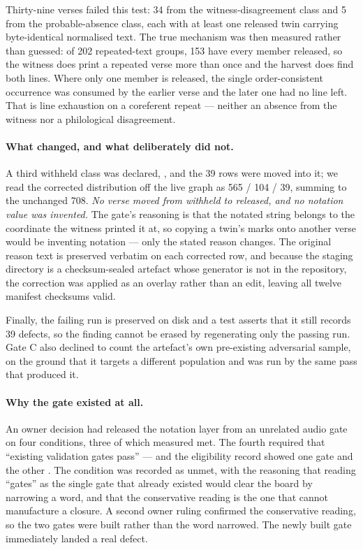 Thirty-nine verses failed this test: 34 from the witness-disagreement class and 5
from the probable-absence class, each with at least one released twin carrying
byte-identical normalised text. The true mechanism was then measured rather than
guessed: of 202 repeated-text groups, 153 have every member released, so the witness
does print a repeated verse more than once and the harvest does find both lines.
Where only one member is released, the single order-consistent occurrence was
consumed by the earlier verse and the later one had no line left. That is line
exhaustion on a coreferent repeat --- neither an absence from the witness nor a
philological disagreement.

\paragraph{What changed, and what deliberately did not.} A third withheld class was
declared, , and the
39 rows were moved into it; we read the corrected distribution off the live graph as
565 / 104 / 39, summing to the unchanged 708. \emph{No verse moved from withheld to
released, and no notation value was invented.} The gate's reasoning is that the
notated string belongs to the coordinate the witness printed it at, so copying a
twin's marks onto another verse would be inventing notation --- only the stated
reason changes. The original reason text is preserved verbatim on each corrected
row, and because the staging directory is a checksum-sealed artefact whose generator
is not in the repository, the correction was applied as an overlay rather than an
edit, leaving all twelve manifest checksums valid.

Finally, the failing run is preserved on disk and a test asserts that it still
records 39 defects, so the finding cannot be erased by regenerating only the passing
run. Gate C also declined to count the artefact's own pre-existing adversarial
sample, on the ground that it targets a different population and was run by the same
pass that produced it.

\paragraph{Why the gate existed at all.} An owner decision had released the notation
layer from an unrelated audio gate on four conditions, three of which measured met.
The fourth required that ``existing validation gates pass'' --- and the eligibility
record showed one gate  and the other . The condition
was recorded as unmet, with the reasoning that reading ``gates'' as the single gate
that already existed would clear the board by narrowing a word, and that the
conservative reading is the one that cannot manufacture a closure. A second owner
ruling confirmed the conservative reading, so the two gates were built rather than
the word narrowed. The newly built gate immediately landed a real defect.

